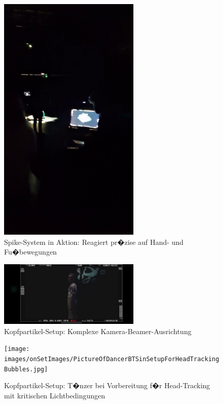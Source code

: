 \begin{figure}[!htbp]
   \centering
   \includegraphics[width=0.6\textwidth,height=0.25\textheight,keepaspectratio]{images/BTS_ProducerScreen.png}
   \caption{Spike-System in Aktion: Reagiert pr�zise auf Hand- und Fu�bewegungen}
   \label{fig:spike_action}
\end{figure}

\begin{figure}[!htbp]
   \centering
   \includegraphics[width=0.6\textwidth,height=0.25\textheight,keepaspectratio]{images/HeadTracking_HQCamera.png}
   \caption{Kopfpartikel-Setup: Komplexe Kamera-Beamer-Ausrichtung}
   \label{fig:head_setup}
\end{figure}

\begin{figure}[!htbp]
   \centering
   \texttt{[image: images/onSetImages/PictureOfDancerBTSinSetupForHeadTrackingBubbles.jpg]}
   \caption{Kopfpartikel-Setup: T�nzer bei Vorbereitung f�r Head-Tracking mit kritischen Lichtbedingungen}
   \label{fig:dancer_head_tracking}
\end{figure}

